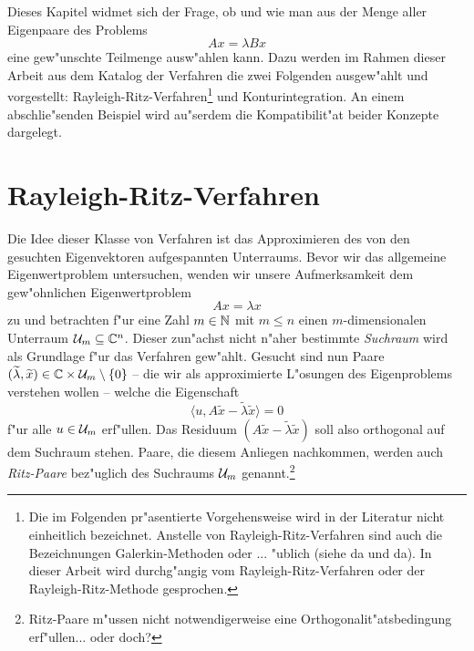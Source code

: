 Dieses Kapitel widmet sich der Frage, ob und wie man aus der Menge aller Eigenpaare
des Problems
\[
Ax = \lambda Bx
\]
eine gew"unschte Teilmenge ausw"ahlen kann. Dazu werden im Rahmen dieser Arbeit aus dem Katalog der Verfahren
die zwei Folgenden ausgew"ahlt und vorgestellt: Rayleigh-Ritz-Verfahren\footnote{Die im Folgenden pr"asentierte Vorgehensweise wird in der
Literatur nicht einheitlich bezeichnet. Anstelle von Rayleigh-Ritz-Verfahren sind auch die Bezeichnungen Galerkin-Methoden oder ... "ublich (siehe da und da).
In dieser Arbeit wird durchg"angig vom Rayleigh-Ritz-Verfahren oder der Rayleigh-Ritz-Methode
gesprochen.} und Konturintegration. An einem abschlie"senden Beispiel wird au"serdem die Kompatibilit"at beider Konzepte dargelegt.

\section{Rayleigh-Ritz-Verfahren}\label{sec:ritz}
Die Idee dieser Klasse von Verfahren ist das Approximieren des von
den gesuchten Eigenvektoren aufgespannten Unterraums. %
Bevor wir das allgemeine Eigenwertproblem untersuchen, wenden wir unsere Aufmerksamkeit
dem gew"ohnlichen Eigenwertproblem
\[
Ax = \lambda x%
\]
zu und betrachten f"ur eine Zahl $m\in\mathbb{N}$ mit $m\le n$
einen $m$-dimensionalen Unterraum $\mathcal{U}_m\subseteq\mathbb{C}^n$. Dieser zun"achst nicht
n"aher bestimmte \emph{Suchraum} wird als Grundlage f"ur das Verfahren gew"ahlt.
Gesucht sind nun Paare $(\widetilde{\lambda}, \widetilde{x})\in\mathbb{C}\times \mathcal{U}_m \setminus\{0\}$ --
die wir als approximierte L"osungen des Eigenproblems verstehen wollen --
welche die Eigenschaft
\begin{equation}\label{eq:orthogonal}
\langle u, A\widetilde{x} - \widetilde{\lambda}\widetilde{x} \rangle=0
\end{equation}
f"ur alle $u \in \mathcal{U}_m $ erf"ullen. Das Residuum $(A\widetilde{x} - \widetilde{\lambda}\widetilde{x})$
soll also orthogonal auf dem Suchraum stehen. Paare, die diesem Anliegen nachkommen,
werden auch \emph{Ritz-Paare} bez"uglich des Suchraums $\mathcal{U}_m$ genannt.\footnote{Ritz-Paare m"ussen nicht notwendigerweise eine Orthogonalit"atsbedingung erf"ullen... oder doch?}\\

